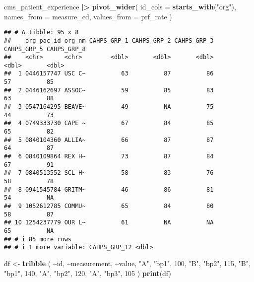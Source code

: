 \documentclass[
]{article}
\newenvironment{Shaded}{\begin{snugshade}}{\end{snugshade}}
\newcommand{\AttributeTok}[1]{\textcolor[rgb]{0.13,0.29,0.53}{#1}}
\newcommand{\DecValTok}[1]{\textcolor[rgb]{0.00,0.00,0.81}{#1}}
\newcommand{\FunctionTok}[1]{\textcolor[rgb]{0.13,0.29,0.53}{\textbf{#1}}}
\newcommand{\NormalTok}[1]{#1}
\newcommand{\OtherTok}[1]{\textcolor[rgb]{0.56,0.35,0.01}{#1}}
\newcommand{\SpecialCharTok}[1]{\textcolor[rgb]{0.81,0.36,0.00}{\textbf{#1}}}
\newcommand{\StringTok}[1]{\textcolor[rgb]{0.31,0.60,0.02}{#1}}
\begin{document}
\begin{Shaded}
\begin{Highlighting}[]
\NormalTok{cms\_patient\_experience }\SpecialCharTok{|\textgreater{}}
  \FunctionTok{pivot\_wider}\NormalTok{(}
    \AttributeTok{id\_cols =} \FunctionTok{starts\_with}\NormalTok{(}\StringTok{"org"}\NormalTok{),}
    \AttributeTok{names\_from =}\NormalTok{ measure\_cd,}
    \AttributeTok{values\_from =}\NormalTok{ prf\_rate}
\NormalTok{  )}
\end{Highlighting}
\end{Shaded}

\begin{verbatim}
## # A tibble: 95 x 8
##    org_pac_id org_nm CAHPS_GRP_1 CAHPS_GRP_2 CAHPS_GRP_3 CAHPS_GRP_5 CAHPS_GRP_8
##    <chr>      <chr>        <dbl>       <dbl>       <dbl>       <dbl>       <dbl>
##  1 0446157747 USC C~          63          87          86          57          85
##  2 0446162697 ASSOC~          59          85          83          63          88
##  3 0547164295 BEAVE~          49          NA          75          44          73
##  4 0749333730 CAPE ~          67          84          85          65          82
##  5 0840104360 ALLIA~          66          87          87          64          87
##  6 0840109864 REX H~          73          87          84          67          91
##  7 0840513552 SCL H~          58          83          76          58          78
##  8 0941545784 GRITM~          46          86          81          54          NA
##  9 1052612785 COMMU~          65          84          80          58          87
## 10 1254237779 OUR L~          61          NA          NA          65          NA
## # i 85 more rows
## # i 1 more variable: CAHPS_GRP_12 <dbl>
\end{verbatim}

\begin{Shaded}
\begin{Highlighting}[]
\NormalTok{df }\OtherTok{\textless{}{-}} \FunctionTok{tribble}\NormalTok{ (}
  \SpecialCharTok{\textasciitilde{}}\NormalTok{id, }\SpecialCharTok{\textasciitilde{}}\NormalTok{measurement, }\SpecialCharTok{\textasciitilde{}}\NormalTok{value,}
  \StringTok{"A"}\NormalTok{, }\StringTok{"bp1"}\NormalTok{, }\DecValTok{100}\NormalTok{,}
  \StringTok{"B"}\NormalTok{, }\StringTok{"bp2"}\NormalTok{, }\DecValTok{115}\NormalTok{,}
  \StringTok{"B"}\NormalTok{, }\StringTok{"bp1"}\NormalTok{, }\DecValTok{140}\NormalTok{,}
  \StringTok{"A"}\NormalTok{, }\StringTok{"bp2"}\NormalTok{, }\DecValTok{120}\NormalTok{,}
  \StringTok{"A"}\NormalTok{, }\StringTok{"bp3"}\NormalTok{, }\DecValTok{105}
\NormalTok{)}
\FunctionTok{print}\NormalTok{(df)}
\end{Highlighting}
\end{Shaded}
\end{document}
